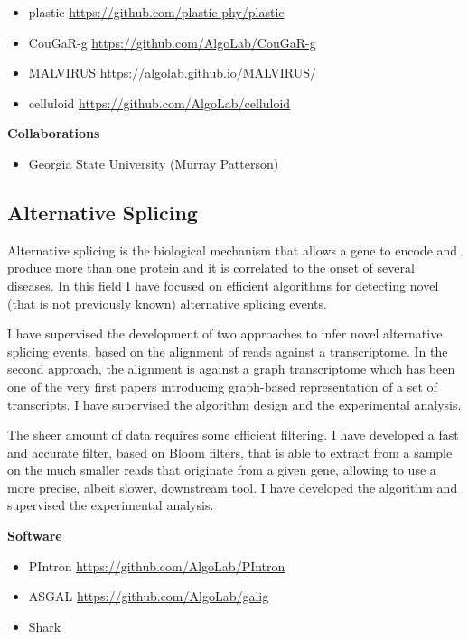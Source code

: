 \documentclass[11pt,a4paper,roman]{moderncv}
\begin{document}
\begin{itemize}
\item
      plastic \url{https://github.com/plastic-phy/plastic}
\item
      CouGaR-g \url{https://github.com/AlgoLab/CouGaR-g}
\item
      MALVIRUS \url{https://algolab.github.io/MALVIRUS/}
\item
      celluloid \url{https://github.com/AlgoLab/celluloid}
\end{itemize}

\textbf{Collaborations}

\begin{itemize}
      \item
      Georgia State University (Murray Patterson)
\end{itemize}

\subsection{Alternative Splicing}\label{splicing}

Alternative splicing is the biological mechanism that allows a gene to encode
and produce more than one protein and it is correlated to the onset of several diseases.
In this field I have focused on efficient algorithms for detecting novel (that
is not previously known) alternative splicing events.

I have supervised the development of two approaches to infer novel alternative
splicing events, based on the alignment of reads against a transcriptome.
In the second approach, the alignment is against a graph transcriptome which has
been one of the very first papers introducing graph-based representation of a
set of transcripts.
I have supervised the algorithm design and the experimental analysis.

The sheer amount of data requires some efficient filtering.
I have developed a fast and accurate filter, based on Bloom filters, that is
able to extract from a sample on the much smaller reads that originate from a
given gene, allowing to use a more precise, albeit slower, downstream tool.
I have developed the algorithm and supervised the experimental analysis.


\textbf{Software}

\begin{itemize}
\item
      PIntron \url{https://github.com/AlgoLab/PIntron}
\item
      ASGAL \url{https://github.com/AlgoLab/galig}
\item
      Shark
\end{itemize}
\end{document}
